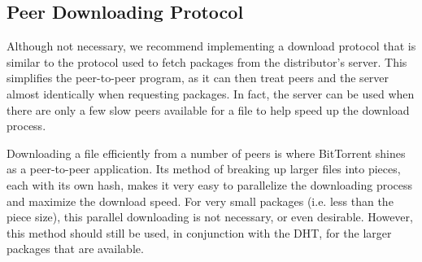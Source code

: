 \documentclass[conference]{IEEEtran}
\begin{document}
% 
% 

\subsection{Peer Downloading Protocol}
\label{downloading}

Although not necessary, we recommend implementing a download
protocol that is similar to the protocol used to fetch packages from
the distributor's server. This simplifies the peer-to-peer program, as it
can then treat peers and the server almost identically when requesting
packages. In fact, the server can be used when there are only a few
slow peers available for a file to help speed up the download
process.

Downloading a file efficiently from a number of peers is where
BitTorrent shines as a peer-to-peer application. Its method of
breaking up larger files into pieces, each with its own hash,
makes it very easy to parallelize the downloading process and
maximize the download speed. For very small packages (i.e. less than
the piece size), this parallel downloading is not necessary, or
even desirable. However, this method should still be used, in
conjunction with the DHT, for the larger packages that are
available.
\end{document}
